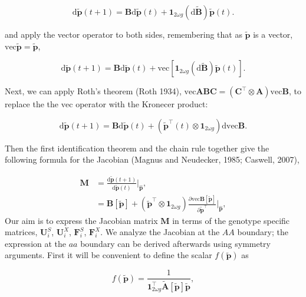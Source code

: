 \documentclass[11pt]{article}
\def\mbf#1{\mathbf{#1}}
\begin{document}
\begin{equation} 
	\text{d} \tilde{\mbf{p}}(t + 1) = \mbf{B}\text{d} \tilde{\mbf{p}}(t) + \mbf{1}_{2 \omega g} \left(\text{d} \tilde{\mbf{B}} \right) \tilde{\mbf{p}}(t).
\end{equation}

\noindent and apply the vector operator to both sides, remembering that as $\tilde{\mbf{p}}$ is a vector, $\text{vec}\tilde{\mbf{p}} = \tilde{\mbf{p}}$,

\begin{equation} 
	\text{d} \tilde{\mbf{p}}(t + 1) = \mbf{B}\text{d} \tilde{\mbf{p}}(t) + \text{vec} \left[ \mbf{1}_{2 \omega g} \left(\text{d} \tilde{\mbf{B}} \right) \tilde{\mbf{p}}(t) \right].
\end{equation}

\noindent Next, we can apply Roth's theorem (Roth 1934), $\text{vec}\mbf{ABC} = \left( \mbf{C}^{\intercal} \otimes \mbf{A} \right) \text{vec}\mbf{B}$, to replace the the $\text{vec}$ operator with the Kronecer product:

\begin{equation} 
	\text{d} \tilde{\mbf{p}}(t + 1) = \mbf{B}\text{d} \tilde{\mbf{p}}(t) + \left( \tilde{\mbf{p}}^{\intercal}(t) \otimes \mbf{1}_{2 \omega g} \right) \text{d}\mbox{vec} \mbf{B}.
\end{equation}

\noindent Then the first identification theorem and the chain rule together give the following formula for the Jacobian (Magnus and Neudecker, 1985; Caswell, 2007),

\begin{align*} \label{eq:genJacobian}
	\mbf{M} &=  \frac{ \text{d} \tilde{\mbf{p}}(t + 1) }{ \text{d} \tilde{\mbf{p}}(t) } \bigg\rvert_{\hat{\mbf{p}}}, \\
			&= \mbf{B}[\tilde{\mbf{p}}] + \left( \tilde{\mbf{p}}^{\intercal} \otimes \mbf{1}_{2 \omega g} \right) \frac{ \partial \text{vec}{\mbf{B}[\tilde{\mbf{p}}]} }{ \partial \tilde{\mbf{p}}^{\intercal} } \bigg\rvert_{\hat{\mbf{p}}},
\end{align*}
\newpage
Our aim is to express the Jacobian matrix $\mbf{M}$ in terms of the genotype specific matrices, $\mbf{U}^S_i$, $\mbf{U}^X_i$, $\mbf{F}^S_i$, $\mbf{F}^X_i$. We analyze the Jacobian at the $AA$ boundary; the expression at the $aa$ boundary can be derived afterwards using symmetry arguments. First it will be convenient to define the scalar $f(\tilde{\mbf{p}})$ as

\begin{equation}
	f(\tilde{\mbf{p}}) = \frac{1}{ \mbf{1}^{\intercal}_{2 \omega g} \tilde{\mbf{A}}[\tilde{\mbf{p}}] \tilde{\mbf{p}}},
\end{equation}
\end{document}
